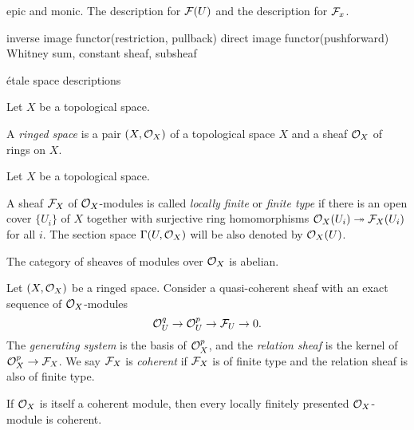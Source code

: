 \documentclass{../../large}
\begin{document}
\begin{prb}
epic and monic.
The description for $\mathcal{F}(U)$ and the description for $\mathcal{F}_x$.
\end{prb}


\begin{prb}
inverse image functor(restriction, pullback)
direct image functor(pushforward)
Whitney sum, constant sheaf, subsheaf

\'etale space descriptions
\begin{parts}
\item
\end{parts}
\end{prb}


\begin{prb}
Let $X$ be a topological space.

A \emph{ringed space} is a pair $(X,\mathcal{O}_X)$ of a topological space $X$ and a sheaf $\mathcal{O}_X$ of rings on $X$.

\end{prb}

\begin{prb}
Let $X$ be a topological space.

A sheaf $\mathcal{F}_X$ of $\mathcal{O}_X$-modules is called \emph{locally finite} or \emph{finite type} if there is an open cover $\{U_i\}$ of $X$ together with surjective ring homomorphisms $\mathcal{O}_X(U_i)\twoheadrightarrow\mathcal{F}_X(U_i)$ for all $i$.
The section space $\Gamma(U,\mathcal{O}_X)$ will be also denoted by $\mathcal{O}_X(U)$.
\begin{parts}
\item The category of sheaves of modules over $\mathcal{O}_X$ is abelian.
\end{parts}
\end{prb}



\begin{prb}
Let $(X,\mathcal{O}_X)$ be a ringed space.
Consider a quasi-coherent sheaf with an exact sequence of $\mathcal{O}_X$-modules
\[\mathcal{O}_U^q\to\mathcal{O}_U^p\to\mathcal{F}_U\to0.\]
The \emph{generating system} is the basis of $\mathcal{O}_X^p$, and the \emph{relation sheaf} is the kernel of $\mathcal{O}_X^p\to\mathcal{F}_X$.
We say $\mathcal{F}_X$ is \emph{coherent} if $\mathcal{F}_X$ is of finite type and the relation sheaf is also of finite type.
\begin{parts}
\item If $\mathcal{O}_X$ is itself a coherent module, then every locally finitely presented $\mathcal{O}_X$-module is coherent.
\end{parts}
\end{prb}
\end{document}
